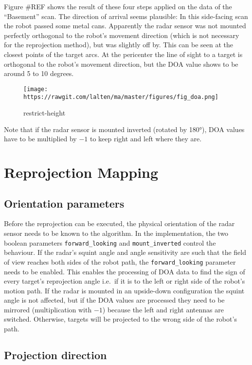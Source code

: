 Figure \#REF shows the result of these four steps applied on the data of
the ``Basement'' scan. The direction of arrival seems plausible: In this
side-facing scan the robot passed some metal cans. Apparently the radar
sensor was not mounted perfectly orthogonal to the robot's movement
direction (which is not necessary for the reprojection method), but was
slightly off by. This can be seen at the closest points of the target
arcs. At the pericenter the line of sight to a target is orthogonal to
the robot's movement direction, but the DOA value shows to be around 5
to 10 degrees.

\begin{figure}
\centering
\texttt{[image: https://rawgit.com/lalten/ma/master/figures/fig\_doa.png]}
\caption{restrict-height}
\end{figure}

Note that if the radar sensor is mounted inverted (rotated by 180°), DOA
values have to be multiplied by \(-1\) to keep right and left where they
are.

\section{Reprojection Mapping}\label{reprojection-mapping}

\subsection{Orientation parameters}\label{orientation-parameters}

Before the reprojection can be executed, the physical orientation of the
radar sensor needs to be known to the algorithm. In the implementation,
the two boolean parameters \texttt{forward\_looking} and
\texttt{mount\_inverted} control the behaviour. If the radar's squint
angle and angle sensitivity are such that the field of view reaches both
sides of the robot path, the \texttt{forward\_looking} parameter needs
to be enabled. This enables the processing of DOA data to find the sign
of every target's reprojection angle i.e.~if it is to the left or right
side of the robot's motion path. If the radar is mounted in an
upside-down configuration the squint angle is not affected, but if the
DOA values are processed they need to be mirrored (multiplication with
\(-1\)) because the left and right antennas are switched. Otherwise,
targets will be projected to the wrong side of the robot's path.

\subsection{Projection direction}\label{projection-direction}

